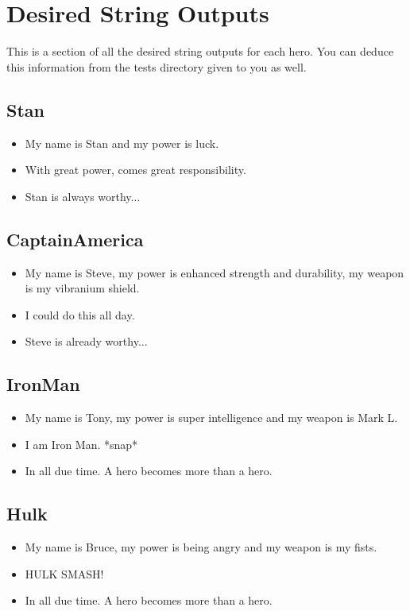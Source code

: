 \documentclass[11pt]{article}
\begin{document}
\section*{Desired String Outputs}
This is a section of all the desired string outputs for each hero. You can deduce this information from the tests directory given to you as well. 
\begin{center}
    \subsection*{Stan}
        \begin{itemize}
            \item My name is Stan and my power is luck.
            \item With great power, comes great responsibility.
            \item Stan is always worthy...
        \end{itemize}
    \subsection*{CaptainAmerica}
        \begin{itemize}
            \item My name is Steve, my power is enhanced strength and durability, my weapon is my vibranium shield.
            \item I could do this all day.
            \item Steve is already worthy...
        \end{itemize}
    \subsection*{IronMan}
        \begin{itemize}
            \item My name is Tony, my power is super intelligence and my weapon is Mark L.
            \item I am Iron Man. *snap* 
            \item In all due time. A hero becomes more than a hero.
        \end{itemize}
    \subsection*{Hulk}
        \begin{itemize}
            \item My name is Bruce, my power is being angry and my weapon is my fists.
            \item HULK SMASH!
            \item In all due time. A hero becomes more than a hero.
        \end{itemize}

\end{center}
\end{document}
